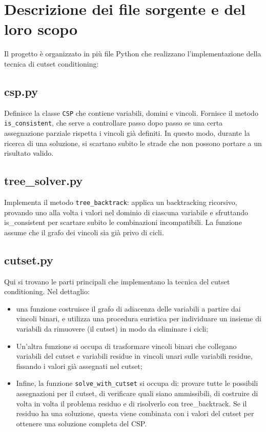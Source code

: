 \documentclass[a4paper,11pt]{article}
\begin{document}
\section{Descrizione dei file sorgente e del loro scopo}
Il progetto è organizzato in più file Python che realizzano l’implementazione della tecnica di cutset conditioning:

\subsection*{csp.py}
Definisce la classe \texttt{CSP} che contiene variabili, domini e vincoli. Fornisce il metodo
\texttt{is\_consistent}, che serve a controllare passo dopo passo se una certa assegnazione
parziale rispetta i vincoli già definiti. In questo modo, durante la ricerca di una soluzione,
si scartano subito le strade che non possono portare a un risultato valido.

\subsection*{tree\_solver.py}
Implementa il metodo \texttt{tree\_backtrack}: applica un backtracking ricorsivo, provando uno alla volta i valori nel dominio di ciascuna variabile e sfruttando is\_consistent per scartare subito le combinazioni incompatibili. La funzione assume che il grafo dei vincoli sia già privo di cicli.

\subsection*{cutset.py}
Qui si trovano le parti principali che implementano la tecnica del cutset conditioning. 
Nel dettaglio:
\begin{itemize}
  \item una funzione costruisce il grafo di adiacenza delle variabili a partire dai vincoli binari, e utilizza una procedura euristica per individuare un insieme di variabili da rimuovere (il cutset) in modo da eliminare i cicli;
  \item Un’altra funzione si occupa di trasformare vincoli binari che collegano variabili del cutset e variabili residue in vincoli unari sulle variabili residue, fissando i valori già assegnati nel cutset;
  \item Infine, la funzione \texttt{solve\_with\_cutset} si occupa di: provare tutte le possibili assegnazioni per il cutset, di verificare quali siano ammissibili, di costruire di volta in volta il problema residuo e di risolverlo con tree\_backtrack. Se il residuo ha una soluzione, questa viene combinata con i valori del cutset per ottenere una soluzione completa del CSP.
\end{itemize}
\end{document}
